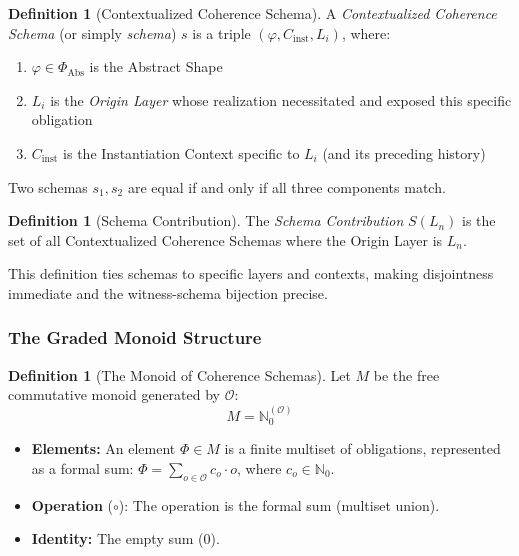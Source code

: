 \documentclass[11pt]{article}
\theoremstyle{definition}
\newtheorem{definition}[theorem]{Definition}
\theoremstyle{remark}
\begin{document}
\begin{definition}[Contextualized Coherence Schema]
\label{def:contextualized-schema-full}
A \emph{Contextualized Coherence Schema} (or simply \emph{schema}) $s$ is a triple $(\varphi, C_{\text{inst}}, L_i)$,
where:
\begin{enumerate}
\item $\varphi \in \Phi_{\text{Abs}}$ is the Abstract Shape
\item $L_i$ is the \emph{Origin Layer} whose realization necessitated and exposed this specific obligation
\item $C_{\text{inst}}$ is the Instantiation Context specific to $L_i$ (and its preceding history)
\end{enumerate}

Two schemas $s_1, s_2$ are equal if and only if all three components match.
\end{definition}

\begin{definition}[Schema Contribution]
\label{def:schema-contribution}
The \emph{Schema Contribution} $S(L_n)$ is the set of all Contextualized Coherence Schemas where
the Origin Layer is $L_n$.
\end{definition}

This definition ties schemas to specific layers and contexts, making disjointness immediate and the
witness-schema bijection precise.

\subsubsection{The Graded Monoid Structure}

\begin{definition}[The Monoid of Coherence Schemas]
\label{def:monoid-schemas}
Let $M$ be the free commutative monoid generated by $\mathcal{O}$:
\[
M = \mathbb{N}_0^{(\mathcal{O})}
\]

\begin{itemize}
\item \textbf{Elements:} An element $\Phi \in M$ is a finite multiset of obligations, represented as a
formal sum: $\Phi = \sum_{o \in \mathcal{O}} c_o \cdot o$, where $c_o \in \mathbb{N}_0$.
\item \textbf{Operation} ($\circ$): The operation is the formal sum (multiset union).
\item \textbf{Identity:} The empty sum (0).
\end{itemize}
\end{definition}
\end{document}
